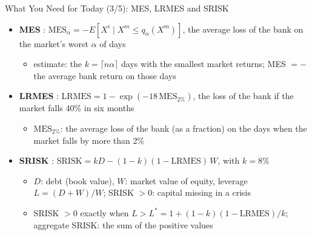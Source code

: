 \begin{frame}{What You Need for Today (3/5): MES, LRMES and SRISK}
\itemsize{\footnotesize}
\begin{itemize}
    \item \textbf{MES} : $\mathrm{MES}_\alpha = -E[X^i \mid X^m \le q_\alpha(X^m)]$, the average loss of the bank on the market's worst $\alpha$ of days
    \begin{itemize}
        \item estimate: the $k = \lceil n\alpha \rceil$ days with the smallest market returns; MES $= -$ the average bank return on those days
    \end{itemize}
    \item \textbf{LRMES} : $\mathrm{LRMES} = 1 - \exp(-18\,\mathrm{MES}_{2\%})$, the loss of the bank if the market falls 40\% in six months
    \begin{itemize}
        \item $\mathrm{MES}_{2\%}$: the average loss of the bank (as a fraction) on the days when the market falls by more than 2\%
    \end{itemize}
    \item \textbf{SRISK} : $\mathrm{SRISK} = kD - (1 - k)(1 - \mathrm{LRMES})\,W$, with $k = 8\%$
    \begin{itemize}
        \item $D$: debt (book value), $W$: market value of equity, leverage $L = (D + W)/W$; SRISK $> 0$: capital missing in a crisis
        \item SRISK $> 0$ exactly when $L > L^* = 1 + (1 - k)(1 - \mathrm{LRMES})/k$; aggregate SRISK: the sum of the positive values
    \end{itemize}
\end{itemize}
\end{frame}

